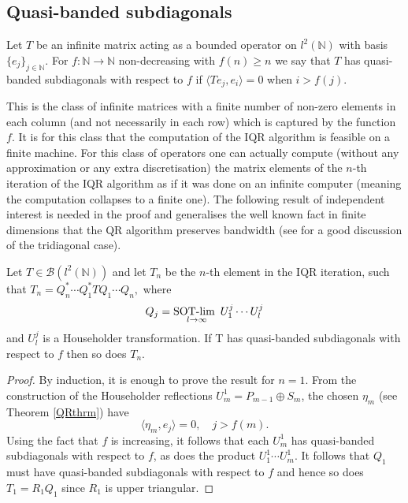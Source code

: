 \documentclass[a4paper,10pt]{article}
\begin{document}
\subsection{Quasi-banded subdiagonals}
\label{Quasi_banded_Subdiagonals}


\begin{definition}
\label{quasi_f}
Let $T$ be an infinite matrix acting as a bounded operator on $l^2(\mathbb{N})$
with basis $\{e_j\}_{j\in\mathbb{N}}$. For $f:\mathbb{N}\rightarrow\mathbb{N}$ non-decreasing with $f(n)\geq n$ we say that $T$ has quasi-banded subdiagonals with respect to $f$ if $\langle Te_j,e_i\rangle = 0$
when $i > f(j).$ 
\end{definition} 

This is the class of infinite matrices with a finite number of non-zero elements in each column (and not necessarily in each row) which is captured by the function $f$. It is for this class that the computation of the IQR algorithm is feasible on a finite machine. For this class of operators one can actually compute (without any approximation or any extra discretisation) the matrix elements of the $n$-th iteration of the IQR algorithm as if it was done on an infinite computer (meaning the computation collapses to a finite one). The following result of independent interest is needed in the proof and generalises the well known fact in finite dimensions that the QR algorithm preserves bandwidth (see \cite{parlett1998symmetric} for a good discussion of the tridiagonal case).

\begin{proposition}\label{subdiagonal}
Let $T \in \mathcal{B}(l^2(\mathbb{N}))$ and let $T_n$ be the $n$-th element in the IQR iteration, such that
$
T_n = Q^*_n \cdots Q^*_1 T Q_1 \cdots Q_n,
$
where 
$$
Q_j = \underset{l \rightarrow \infty}{\text{SOT-lim \,}} U^j_1\cdots U^j_l
$$ and $U^j_l$ is a Householder transformation. 
If T has quasi-banded subdiagonals with respect to $f$ then so does $T_n$.
\end{proposition}

\begin{proof}
By induction, it is enough to prove the result for $n=1$. From the construction of the Householder reflections $U_m^1=P_{m-1}\oplus S_m$, the chosen $\eta_m$ (see Theorem \ref{QRthrm}) have
\begin{equation}
\langle \eta_m, e_j\rangle = 0, \quad j>f(m).
\end{equation}
Using the fact that $f$ is increasing, it follows that each $U^1_m$ has quasi-banded subdiagonals with respect to $f$, as does the product $U^1_1\cdots U^1_m$. It follows that $Q_1$ must have quasi-banded subdiagonals with respect to $f$ and hence so does $T_1=R_1Q_1$ since $R_1$ is upper triangular.
\end{proof}
\end{document}
